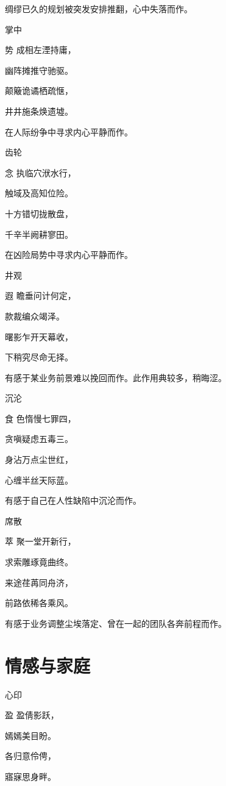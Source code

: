 \documentclass{article}
\newenvironment{poem}[3]{
\begin{minipage}{\textwidth}
\begin{pinyinscope}\begin{center}\Large\linespread{1.4}\selectfont #2\end{center}\end{pinyinscope}
\begin{pinyinscope}
	\begin{center}
	\Large\linespread{1.4}\rmfamily\selectfont #3
}{\end{center}
\end{pinyinscope}
\end{minipage}
}
\begin{document}
绸缪已久的规划被突发安排推翻，心中失落而作。

\begin{poem}{}{掌中}
势成相左湮持庸，

幽阵摊推守驰驱。

颠簸诡谲栖疏惬，

井井施条焕遗墟。
\end{poem}

在人际纷争中寻求内心平静而作。

\begin{poem}{}{齿轮}
念执临穴{\textsf 洑}水行，

触域及高知位险。

十方错切拢散盘，

千辛半阙耕寥田。
\end{poem}

在凶险局势中寻求内心平静而作。

\begin{poem}{}{井观}
遐瞻垂问计何定，

款{}裁编众竭泽。

曙影乍开天幕收，

下稍究尽命无择。
\end{poem}

有感于某业务前景难以挽回而作。此作用典较多，稍晦涩。

\begin{poem}{}{沉沦}
食色惰慢七罪四，

贪嗔疑虑五毒三。

身沾万点尘世红，

心缠半丝天际蓝。
\end{poem}

有感于自己在人性缺陷中沉沦而作。

\begin{poem}{}{席散}
萃聚一堂开新行，

求索雕琢竟曲终。

来途荏苒同舟济，

前路依稀各乘风。
\end{poem}

有感于业务调整尘埃落定、曾在一起的团队各奔前程而作。

\section{情感与家庭}

\begin{poem}{}{心印}
盈盈倩影跃，

嫣嫣美目盼。

各归意伶俜，

寤寐思身畔。
\end{poem}
\end{document}
